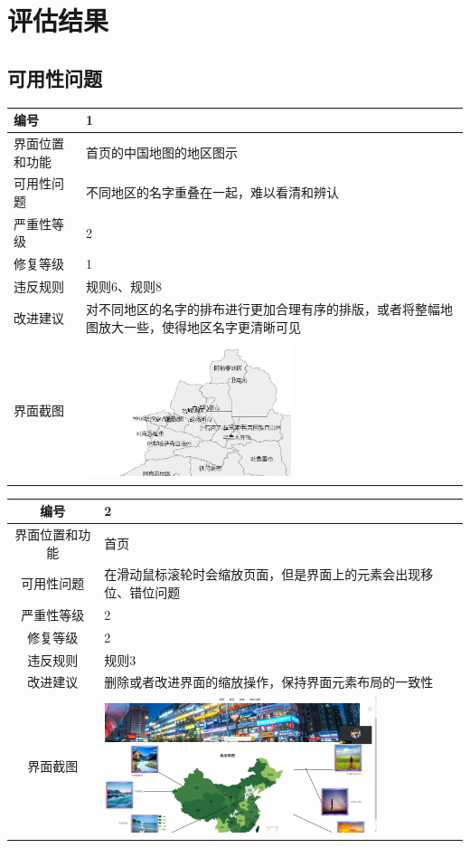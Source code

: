 \documentclass[a4paper,12pt]{article}
\begin{document}
\section{评估结果}
\subsection{可用性问题}
\begin{tabular}{|m{3cm}<{\centering}|p{10cm}|}
	\hline
	编号 & 1 \\
	\hline
	界面位置和功能 & 首页的中国地图的地区图示 \\
	\hline
	可用性问题 & 不同地区的名字重叠在一起，难以看清和辨认 \\
	\hline
	严重性等级 & 2 \\
	\hline
	修复等级 & 1 \\
	\hline
	违反规则 & 规则6、规则8 \\
	\hline
	改进建议 & 对不同地区的名字的排布进行更加合理有序的排版，或者将整幅地图放大一些，使得地区名字更清晰可见 \\
	\hline
	界面截图 & \includegraphics[width=6cm, height=4cm]{q1.jpg} \\
	\hline
\end{tabular}

\vspace{2em}

\begin{tabular}{|c|p{10cm}|}
	\hline
	编号 & 2 \\
	\hline
	界面位置和功能 & 首页 \\
	\hline
	可用性问题 & 在滑动鼠标滚轮时会缩放页面，但是界面上的元素会出现移位、错位问题 \\
	\hline
	严重性等级 & 2 \\
	\hline
	修复等级 & 2 \\
	\hline
	违反规则 & 规则3 \\
	\hline
	改进建议 & 删除或者改进界面的缩放操作，保持界面元素布局的一致性 \\
	\hline
	界面截图 & \includegraphics[width=8cm, height=4cm]{q2.jpg} \\
	\hline
\end{tabular}
\end{document}
